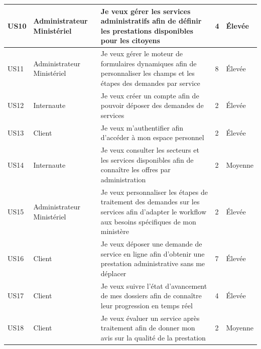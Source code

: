 \begin{longtable}{|p{1cm}|p{3cm}|p{6.5cm}|p{1.5cm}|p{2cm}|}
US10 & Administrateur Ministériel & Je veux gérer les services administratifs afin de définir les prestations disponibles pour les citoyens & 4 & Élevée \\ \hline
US11 & Administrateur Ministériel & Je veux gérer le moteur de formulaires dynamiques afin de personnaliser les champs et les étapes des demandes par service & 8 & Élevée \\ \hline
US12 & Internaute & Je veux créer un compte afin de pouvoir déposer des demandes de services & 2 & Élevée \\ \hline
US13 & Client & Je veux m'authentifier afin d'accéder à mon espace personnel & 2 & Élevée \\ \hline
US14 & Internaute & Je veux consulter les secteurs et les services disponibles afin de connaître les offres par administration & 2 & Moyenne \\ \hline
US15 & Administrateur Ministériel & Je veux personnaliser les étapes de traitement des demandes sur les services afin d’adapter le workflow aux besoins spécifiques de mon ministère & 2 & Élevée \\ \hline
US16 & Client & Je veux déposer une demande de service en ligne afin d'obtenir une prestation administrative sans me déplacer & 7 & Élevée \\ \hline
US17 & Client & Je veux suivre l'état d'avancement de mes dossiers afin de connaître leur progression en temps réel & 4 & Élevée \\ \hline
US18 & Client & Je veux évaluer un service après traitement afin de donner mon avis sur la qualité de la prestation & 2 & Moyenne \\ \hline


\end{longtable}
